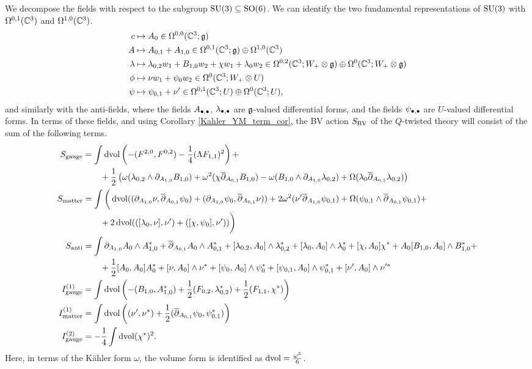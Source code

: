 \documentclass[10pt, oneside]{article}
\begin{document}
We decompose the fields with respect to the subgroup $\mathrm{SU}(3) \subseteq \mathrm{SO}(6)$.  We can identify the two fundamental representations of $\mathrm{SU}(3)$ with $\Omega^{0,1}(\mathbb C^3)$ and $\Omega^{1,0}(\mathbb C^3)$. 
\begin{align*}
c & \mapsto A_0 \in \Omega^{0,0}(\mathbb C^3 ; \mathfrak g) \\
A & \mapsto A_{0,1} + A_{1,0} \in \Omega^{0,1}(\mathbb C^3 ; \mathfrak g) \oplus \Omega^{1,0}(\mathbb C^3) \\
\lambda & \mapsto \lambda_{0,2} w_1 + {B}_{1,0}w_2 + \chi w_1 + \lambda_0 w_2 \in \Omega^{0,2}(\mathbb C^3 ; W_+ \otimes \mathfrak g) \oplus \Omega^{0}(\mathbb C^3 ; W_+ \otimes \mathfrak g) \\
\phi & \mapsto \nu w_1 + \psi_0 w_2 \in \Omega^0(\mathbb C^3; W_+ \otimes U) \\
\psi & \mapsto \psi_{0,1} + \nu' \in \Omega^{0,1}(\mathbb C^3; U) \oplus \Omega^0(\mathbb C^3; U),
\end{align*} 
and similarly with the anti-fields, where the fields $A_{\bullet, \bullet}$, $\lambda_{\bullet,\bullet}$ are $\mathfrak g$-valued differential forms, and the fields $\psi_{\bullet,\bullet}$ are $U$-valued differential forms.  In terms of these fields, and using Corollary \ref{Kahler_YM_term_cor}, the BV action $S_{\mathrm{BV}}$ of the $Q$-twisted theory will consist of the sum of the following terms.
\begin{align*}
S_{\mathrm{gauge}} &= \int \operatorname{dvol} \left(-(F^{2, 0}, F^{0, 2}) - \frac{1}{4}(\Lambda F_{1, 1})^2\right) + \\
&\qquad + \frac 12 \left( \omega(\lambda_{0,2} \wedge \partial_{A_{1,0}} B_{1,0}) + \omega^2(\chi \overline{\partial}_{A_{0,1}} B_{1,0}) - \omega(B_{1,0} \wedge \partial_{A_{1,0}} \lambda_{0,2}) + \Omega(\lambda_0 \overline{\partial}_{A_{0,1}} \lambda_{0,2})   \right)  \\
S_{\mathrm{matter}} &= \int \bigg( \operatorname{dvol} ((\partial_{A_{1,0}}\nu, \overline{\partial}_{A_{0,1}} \psi_0) + (\partial_{A_{1,0}}\psi_0, \overline{\partial}_{A_{0,1}} \nu)) + 2\omega^2(\nu' \overline{\partial}_{A_{1,0}} \psi_{0,1}) + \Omega(\psi_{0,1} \wedge \overline{\partial}_{A_{0,1}} \psi_{0,1}) + \\
&\qquad + 2\operatorname{dvol}(([\lambda_0,\nu],\nu') + ([\chi, \psi_0], \nu') )   \bigg) \\
S_{\mathrm{anti}} &= \int \partial_{A_{1, 0}} A_0 \wedge A_{1, 0}^* + \overline{\partial}_{A_{0, 1}} A_0\wedge A_{0, 1}^* + [\lambda_{0,2}, A_0]\wedge \lambda_{0,2}^* +  [\lambda_{0}, A_0]\wedge \lambda_{0}^* + [\chi, A_0]\chi^* +A_0[B_{1,0}, A_0]\wedge B_{1,0}^* + \\
&\qquad + \frac{1}{2}[A_0, A_0]A_0^* + [\nu, A_0]\wedge \nu^* + [\psi_{0}, A_0]\wedge \psi_{0}^* + [\psi_{0,1}, A_0]\wedge \psi_{0,1}^* + [\nu', A_0]\wedge \nu'^* \\
I^{(1)}_{\mathrm{gauge}} &=  \int \operatorname{dvol} \left( - (B_{1,0}, A_{1,0}^*) + \frac 12 (F_{0,2},\lambda_{0,2}^*) + \frac 12 (F_{1,1}, \chi^*)  \right)\\
I^{(1)}_{\mathrm{matter}} &=  \int \operatorname{dvol} \left( (\nu', \nu^*) + \frac 12( \overline{\partial}_{A_{0,1}} \psi_0, \psi_{0,1}^*) \right)\\
I^{(2)}_{\mathrm{gauge}} &= -\frac{1}{4}\int \operatorname{dvol} (\chi^*)^2.
\end{align*}
Here, in terms of the K\"ahler form $\omega$, the volume form is identified as $\operatorname{dvol} = \frac{\omega^3}6$.
\end{document}
